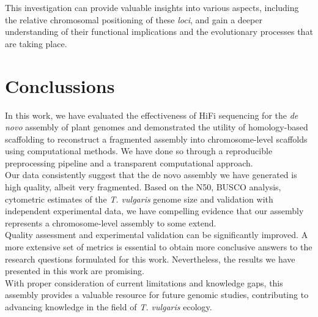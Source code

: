 This investigation can provide valuable insights into various aspects, including the relative chromosomal positioning of these \textit{loci}, and gain a deeper understanding of their functional implications and the evolutionary processes that are taking place. \\

\chapter{Conclussions}\label{cha:conclusion}


In this work, we have evaluated the effectiveness of \ac{HiFi} sequencing for the \textit{de novo} assembly of plant genomes and demonstrated the utility of homology-based scaffolding to reconstruct a fragmented assembly into chromosome-level scaffolds using computational methods. We have done so through a reproducible preprocessing pipeline and a transparent computational approach. \\

Our data consistently suggest that the de novo assembly we have generated is high quality, albeit very fragmented. Based on the N50, BUSCO analysis, cytometric estimates of the \textit{T. vulgaris} genome size and validation with independent experimental data, we have compelling evidence that our assembly represents a chromosome-level assembly to some extend.\\

Quality assessment and experimental validation can be significantly improved. A more extensive set of metrics is essential to obtain more conclusive answers to the research questions formulated for this work. Nevertheless, the results we have presented in this work are promising.\\

With proper consideration of current limitations and knowledge gaps, this assembly provides a valuable resource for future genomic studies, contributing to advancing knowledge in the field of \textit{T. vulgaris} ecology.\\
